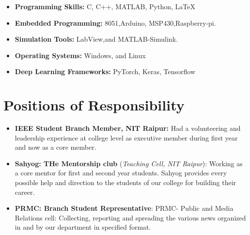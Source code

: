 \documentclass[11pt,a4paper,calibri]{moderncv}        %
\begin{document}
\begin{itemize}[leftmargin=0.0in]
\begin{itemize}[leftmargin=.2in]
\setlength\itemsep{.2em}
\item \textbf{Programming Skills:} C, C++, MATLAB, Python, \LaTeX
\vspace{-1pt}
\item \textbf{Embedded Programming:} 8051,Arduino, MSP430,Raspberry-pi.
\vspace{-1pt}
\item \textbf{Simulation Tools:} LabView,and MATLAB-Simulink.
\vspace{-1pt}
\item \textbf{Operating Systems:} Windows, and Linux
\vspace{-1pt}
\item \textbf{Deep Learning Frameworks:} PyTorch, Keras, Tensorflow
\end{itemize}

\section{Positions of Responsibility}

\begin{itemize}[leftmargin=.2in]
\setlength\itemsep{.2em}

\item \textbf{IEEE Student Branch Member, NIT Raipur:} Had a volunteering and leadership experience at college level as executive member during first year and now as a core member.
\vspace{-1pt}
\item \textbf{Sahyog: THe Mentorship club} (\textit{Teaching Cell, NIT Raipur}): Working as a core mentor for first and second year students. Sahyog provides every possible help and direction to the students of our college for building their career.
\vspace{-1pt}
\item \textbf{PRMC: Branch Student Representative}: PRMC- Public and Media Relations cell:  Collecting, reporting and spreading the various news organized in and by our department in specified format.

\end{itemize}


\end{itemize}
\end{document}
